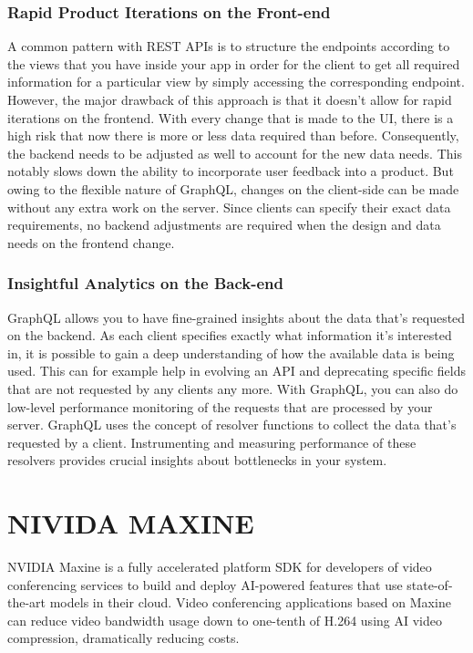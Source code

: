 \subsubsection{Rapid Product Iterations on the Front-end}

A common pattern with REST APIs is to structure the endpoints according to the views that you have inside your app 
in order for the client to get all required information for a particular view by simply accessing the corresponding 
endpoint. However, the major drawback of this approach is that it doesn’t allow for rapid iterations on the frontend. 
With every change that is made to the UI, there is a high risk that now there is more or less data required than before.
Consequently, the backend needs to be adjusted as well to account for the new data needs. This notably slows down the 
ability to incorporate user feedback into a product. But owing to the flexible nature of GraphQL, changes on the 
client-side can be made without any extra work on the server. Since clients can specify their exact data requirements, 
no backend adjustments are required when the design and data needs on the frontend change.

\subsubsection{Insightful Analytics on the Back-end}

GraphQL allows you to have fine-grained insights about the data that’s requested on the backend. As each client specifies 
exactly what information it’s interested in, it is possible to gain a deep understanding of how the available data is being 
used. This can for example help in evolving an API and deprecating specific fields that are not requested by any clients any more.
With GraphQL, you can also do low-level performance monitoring of the requests that are processed by your server. 
GraphQL uses the concept of resolver functions to collect the data that’s requested by a client. Instrumenting and measuring 
performance of these resolvers provides crucial insights about bottlenecks in your system.

\section{NIVIDA MAXINE}

NVIDIA Maxine is a fully accelerated platform SDK for developers of video 
conferencing services to build and deploy AI-powered features that use state-of-the-art 
models in their cloud. Video conferencing applications based on Maxine can reduce video 
bandwidth usage down to one-tenth of H.264 using AI video compression, dramatically reducing costs.

